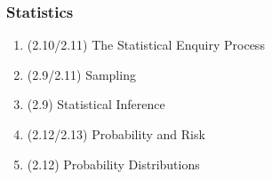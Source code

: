 \subsubsection*{Statistics}
\begin{enumerate}[resume]
  \item (2.10/2.11) The Statistical Enquiry Process
  \item (2.9/2.11) Sampling
  \item (2.9) Statistical Inference
  \item (2.12/2.13) Probability and Risk
  \item (2.12) Probability Distributions
\end{enumerate}


